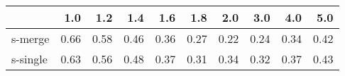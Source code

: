 \begin{tabular}{lrrrrrrrrr}
\toprule
{} &  1.0 &  1.2 &  1.4 &  1.6 &  1.8 &  2.0 &  3.0 &  4.0 &  5.0 \\
\midrule
s-merge  & 0.66 & 0.58 & 0.46 & 0.36 & 0.27 & 0.22 & 0.24 & 0.34 & 0.42 \\
s-single & 0.63 & 0.56 & 0.48 & 0.37 & 0.31 & 0.34 & 0.32 & 0.37 & 0.43 \\
\bottomrule
\end{tabular}
